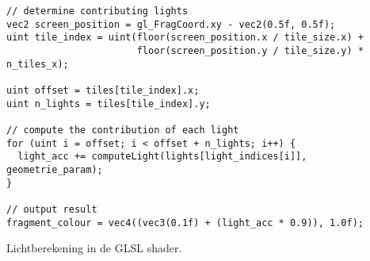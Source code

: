 \begin{listing}[b]
 \begin{verbatim}
// determine contributing lights
vec2 screen_position = gl_FragCoord.xy - vec2(0.5f, 0.5f);
uint tile_index = uint(floor(screen_position.x / tile_size.x) +
                       floor(screen_position.y / tile_size.y) * n_tiles_x);

uint offset = tiles[tile_index].x;
uint n_lights = tiles[tile_index].y;

// compute the contribution of each light
for (uint i = offset; i < offset + n_lights; i++) {
  light_acc += computeLight(lights[light_indices[i]], geometrie_param);
}

// output result
fragment_colour = vec4((vec3(0.1f) + (light_acc * 0.9)), 1.0f);
  \end{verbatim}
  \caption{Lichtberekening in de GLSL shader.}
  \label{lst:hs-lichttoekenning}
\end{listing}
